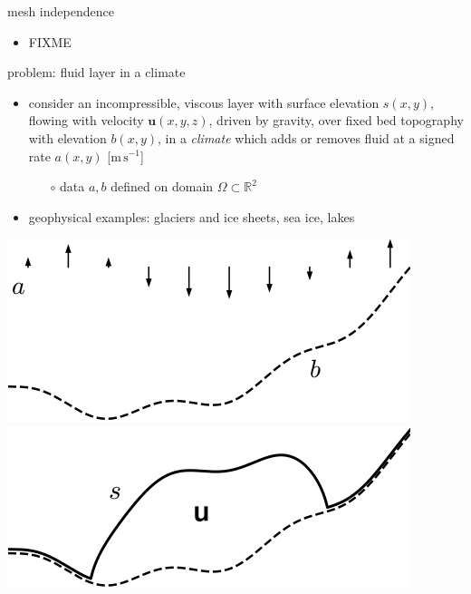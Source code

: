 \documentclass[svgnames,
               hyperref={colorlinks,citecolor=DeepPink4,linkcolor=FireBrick,urlcolor=Maroon},
               usepdftitle=false]  %
               {beamer}
\newcommand{\RR}{\mathbb{R}}
\newcommand{\bu}{\mathbf{u}}
\begin{document}
\begin{frame}{mesh independence}

\begin{itemize}
\item FIXME
\end{itemize}
\end{frame}


\begin{frame}{problem: fluid layer in a climate}

\begin{itemize}
\item consider an incompressible, viscous layer with surface elevation $s(x,y)$, flowing with velocity $\bu(x,y,z)$, driven by gravity, over fixed bed topography with elevation $b(x,y)$, in a \emph{climate} which adds or removes fluid at a signed rate $a(x,y)$ [$\text{m}\,\text{s}^{-1}$]
    \begin{itemize}
    \item[$\circ$] data $a,b$ defined on domain $\Omega \subset \RR^2$
    \end{itemize}
\item geophysical examples: \alert{glaciers and ice sheets}, sea ice, lakes
\end{itemize}

\bigskip
\hfill \mbox{\includegraphics[height=0.25\textheight]{../talk-oxford/images/domain-data.png} \hspace{7mm} \includegraphics[height=0.25\textheight]{../talk-oxford/images/domain-velocity.png}}
\end{frame}
\end{document}
